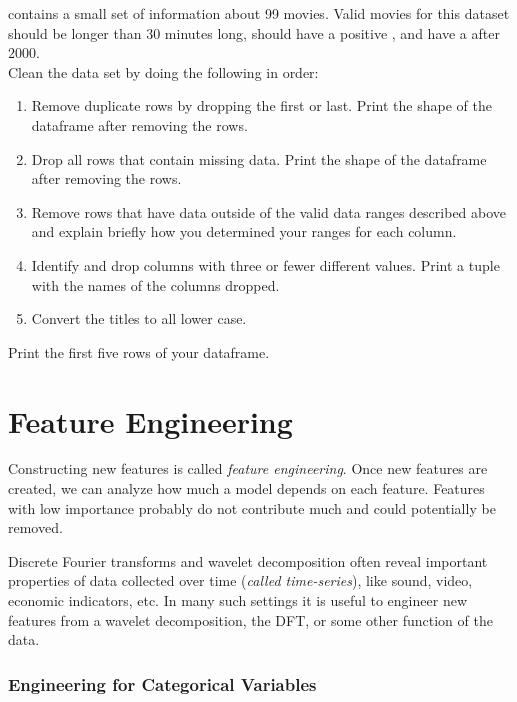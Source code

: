 \begin{problem}
 contains a small set of information about 99 movies. Valid movies for this dataset should be longer than $30$ minutes long, should have a positive , and have a  after $2000$.
\\

\noindent Clean the data set by doing the following in order:

\begin{enumerate}

 \item Remove duplicate rows by dropping the first or last. Print the shape of the dataframe after removing the rows.

 \item Drop all rows that contain missing data. Print the shape of the dataframe after removing the rows.

 \item Remove rows that have data outside of the valid data ranges described above and explain briefly how you determined your ranges for each column.

 \item Identify and drop columns with three or fewer different values. Print a tuple with the names of the columns dropped.

 \item Convert the titles to all lower case.

\end{enumerate}
Print the first five rows of your dataframe.
\end{problem}

\section*{Feature Engineering}

Constructing new features is called \emph{feature engineering}.
Once new features are created, we can analyze how much a model depends on each feature.
Features with low importance probably do not contribute much and could potentially be removed.

Discrete Fourier transforms and wavelet decomposition often reveal important properties of data collected over time (\emph{called time-series}), like sound, video, economic indicators, etc.  In many such settings it is useful to engineer new features from a  wavelet decomposition, the DFT, or some other function of the data.

\subsubsection{Engineering for Categorical Variables}

